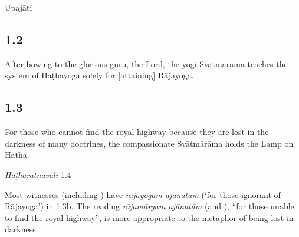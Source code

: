 \begin{ekdosis}
\begin{metre}[hp01_001]
Upajāti
\end{metre}
\subsection*{1.2}
\begin{translation}[hp01_002]
After bowing to the glorious guru, the Lord, the yogi Svātmārāma teaches the system of Haṭhayoga solely for [attaining] Rājayoga.
\end{translation}

\begin{philcomm}[hp01_002]
\end{philcomm}

\subsection*{1.3}
\begin{translation}[hp01_003]
 For those who cannot find the royal highway because they are lost in the darkness of many doctrines, the compassionate Svātmārāma holds the Lamp on Haṭha.
\end{translation}

\begin{testimonia}[hp01_003]
\emph{Haṭharatnāvalī} 1.4

\begin{versinnote}
\tl{\var{rājayogam ] rājamārgam P,T,t1}\\!}
\end{versinnote}

\end{testimonia}

\begin{philcomm}[hp01_003] 
Most witnesses (including \alphaTwo) have \emph{rājayogam ajānatām} (`for those ignorant of Rājayoga') in 1.3b. The reading \emph{rājamārgam ajānatām} (\alphaOne and \alphaThree), “for those unable to find the royal highway”, is more appropriate to the metaphor of being lost in darkness. 


\end{philcomm}
\end{ekdosis}
